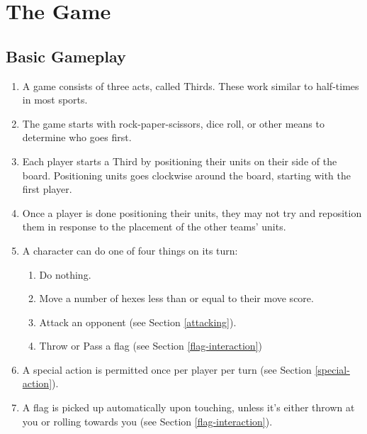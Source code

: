 \chapter{The Game}
\section{Basic Gameplay} \label{basic-gameplay}
\begin{enumerate}
    \item A game consists of three acts, called Thirds. These work similar to half-times in most sports.
    \item The game starts with rock-paper-scissors, dice roll, or other means to determine who goes first.
    \item Each player starts a Third by positioning their units on their side of the board. Positioning units goes clockwise around the board, starting with the first player. 
    \item Once a player is done positioning their units, they may not try and reposition them in response to the placement of the other teams’ units.
    \item A character can do one of four things on its turn:
    \begin{enumerate}
        \item Do nothing.
        \item Move a number of hexes less than or equal to their move score.
        \item Attack an opponent (see Section \ref{attacking}).
        \item Throw or Pass a flag (see Section \ref{flag-interaction})
    \end{enumerate}
    \item A special action is permitted once per player per turn (see Section \ref{special-action}).
    \item A flag is picked up automatically upon touching, unless it’s either thrown at you or rolling towards you (see Section \ref{flag-interaction}).
\end{enumerate}